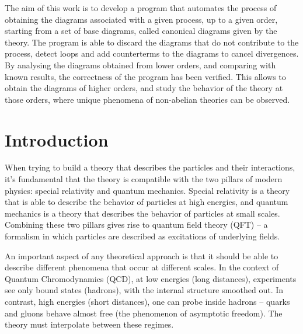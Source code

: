 \documentclass[11pt,a4paper,twoside,pdf]{article}
\numberwithin{equation}{section}
\begin{document}
\begin{center}
\begin{minipage}{0.8\linewidth}
The aim of this work is to develop a program that automates the process of
obtaining the diagrams associated with a given process, up to a given order,
starting from a set of base diagrams, called canonical diagrams given by the
theory. The program is able to discard the diagrams that do not contribute to the
process, detect loops and add counterterms to the diagrams to cancel divergences. \\

By analysing the diagrams obtained from lower orders, and comparing with known
results, the correctness of the program has been verified. This allows to obtain
the diagrams of higher orders, and study the behavior of the theory at those
orders, where unique phenomena of non-abelian theories can be observed.

\end{minipage}

\newpage

\end{center}


\pagestyle{empty}       %
\tableofcontents
\setcounter{page}{0}
\cleardoublepage        %


\pagestyle{fancy}
\fancyhead[RO,LE]{\leftmark}
\fancyhead[LO,RE]{\thepage}
\fancyfoot{}

\newpage

\section{Introduction}

When trying to build a theory that describes the particles and their interactions, 
it's fundamental that the theory is compatible with the two pillars of modern physics:
special relativity and quantum mechanics. Special relativity is a theory 
that is able to describe the behavior of particles at high energies, and quantum 
mechanics is a theory that describes the behavior of particles at small scales.
Combining these two pillars gives rise to quantum field theory (QFT) – a formalism 
in which particles are described as excitations of underlying fields.

An important aspect of any theoretical approach is that it should be able to describe  
different phenomena that occur at different scales. In the context of Quantum 
Chromodynamics (QCD), at low energies (long distances), experiments see only bound 
states (hadrons), with the internal structure smoothed out. In contrast, high energies 
(short distances), one can probe inside hadrons – quarks and gluons behave almost free 
(the phenomenon of asymptotic freedom). The theory must interpolate between these regimes.
\end{document}
